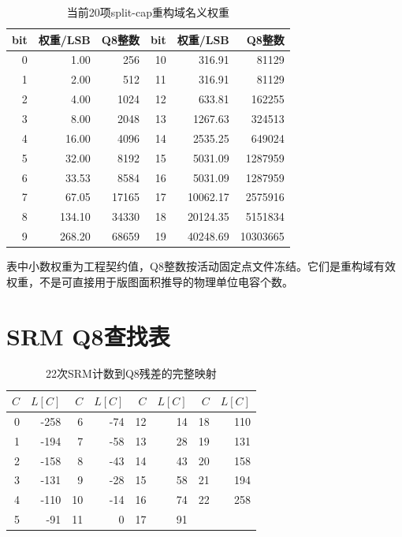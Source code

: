 \documentclass[11pt,a4paper,UTF8,fontset=none,openany]{ctexrep}
\numberwithin{equation}{chapter}
\numberwithin{figure}{chapter}
\numberwithin{table}{chapter}
\begin{document}
\begin{table}[htbp]
\centering
\caption{当前20项split-cap重构域名义权重}
\begin{tabular}{@{}rrrrrr@{}}
\toprule
bit & 权重/LSB & Q8整数 & bit & 权重/LSB & Q8整数 \\
\midrule
0 & 1.00 & 256 & 10 & 316.91 & 81129 \\
1 & 2.00 & 512 & 11 & 316.91 & 81129 \\
2 & 4.00 & 1024 & 12 & 633.81 & 162255 \\
3 & 8.00 & 2048 & 13 & 1267.63 & 324513 \\
4 & 16.00 & 4096 & 14 & 2535.25 & 649024 \\
5 & 32.00 & 8192 & 15 & 5031.09 & 1287959 \\
6 & 33.53 & 8584 & 16 & 5031.09 & 1287959 \\
7 & 67.05 & 17165 & 17 & 10062.17 & 2575916 \\
8 & 134.10 & 34330 & 18 & 20124.35 & 5151834 \\
9 & 268.20 & 68659 & 19 & 40248.69 & 10303665 \\
\bottomrule
\end{tabular}
\end{table}

表中小数权重为工程契约值，Q8整数按活动固定点文件冻结。它们是重构域有效
权重，不是可直接用于版图面积推导的物理单位电容个数。

\chapter{SRM Q8查找表}

\begin{table}[htbp]
\centering
\caption{22次SRM计数到Q8残差的完整映射}
\begin{tabular}{@{}rrrrrrrr@{}}
\toprule
$C$ & $L[C]$ & $C$ & $L[C]$ & $C$ & $L[C]$ & $C$ & $L[C]$ \\
\midrule
0 & -258 & 6 & -74 & 12 & 14 & 18 & 110 \\
1 & -194 & 7 & -58 & 13 & 28 & 19 & 131 \\
2 & -158 & 8 & -43 & 14 & 43 & 20 & 158 \\
3 & -131 & 9 & -28 & 15 & 58 & 21 & 194 \\
4 & -110 & 10 & -14 & 16 & 74 & 22 & 258 \\
5 & -91 & 11 & 0 & 17 & 91 & & \\
\bottomrule
\end{tabular}
\end{table}
\end{document}
